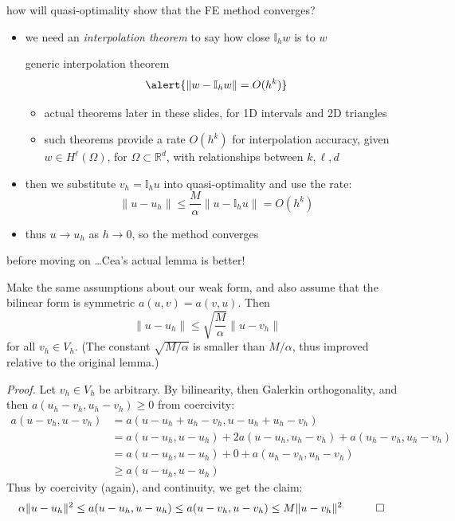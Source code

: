 \documentclass[10pt,
               svgnames,
               hyperref={colorlinks,
                         citecolor=DeepPink4,
                         linkcolor=FireBrick,
                         urlcolor=blue},
               usepdftitle=false]{beamer}
\newcommand{\II}{\mathbb{I}}
\newcommand{\RR}{\mathbb{R}}
\begin{document}
\begin{frame}{how will quasi-optimality show that the FE method converges?}

\begin{itemize}
\item we need an \emph{interpolation theorem} to say how close $\II_h w$ is to $w$

\begin{block}{generic interpolation theorem}
    $$\alert{\|w-\II_h w\| = O(h^k)}$$
\end{block}

    \begin{itemize}
    \item[$\circ$] actual theorems later in these slides, for 1D intervals and 2D triangles
    \item[$\circ$] such theorems provide a rate $O(h^k)$ for interpolation accuracy, given $w\in H^\ell(\Omega)$, for $\Omega\subset \RR^d$, with relationships between $k,\ell,d$
    \end{itemize}
\item then we \alert{substitute $v_h = \II_h u$ into quasi-optimality} and use the rate:
	$$\|u-u_h\| \le \frac{M}{\alpha} \|u-\II_h u\| = O(h^k)$$
\item thus $u\to u_h$ as $h\to 0$, so the method \alert{converges}
\end{itemize}
\end{frame}


\begin{frame}{before moving on \dots Cea's actual lemma is better!}

\begin{lemma}
Make the same assumptions about our weak form, and also assume that the bilinear form is \alert{symmetric} $a(u,v)=a(v,u)$.  Then
	$$\|u-u_h\| \le \sqrt{\frac{M}{\alpha}} \|u-v_h\|$$
for all $v_h\in V_h$.  (The constant $\sqrt{M/\alpha}$ is smaller than $M/\alpha$, thus \alert{improved} relative to the original lemma.)
\end{lemma}

{\footnotesize
\emph{Proof.}  Let $v_h\in V_h$ be arbitrary.  By bilinearity, then Galerkin orthogonality, and then $a(u_h-v_h,u_h-v_h)\ge 0$ from coercivity:
\begin{align*}
a(u-v_h,u-v_h) &= a(u-u_h+u_h-v_h,u-u_h+u_h-v_h) \\
&= a(u-u_h,u-u_h) + 2 a(u-u_h,u_h-v_h) + a(u_h-v_h,u_h-v_h) \\
&= a(u-u_h,u-u_h) + 0 + a(u_h-v_h,u_h-v_h) \\
&\ge a(u-u_h,u-u_h)
\end{align*}
Thus by coercivity (again), and continuity, we get the claim:
\begin{align*}
\alpha \|u-u_h\|^2 &\le a(u-u_h,u-u_h) \le a(u-v_h,u-v_h) \le M \|u-v_h\|^2 \quad \qed
\end{align*}
}
\end{frame}
\end{document}
